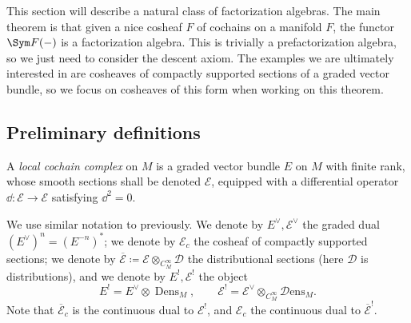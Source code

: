This section will describe a natural class of factorization algebras. The main theorem is that given a nice cosheaf $F$ of cochains on a manifold $F$, the functor $\Sym F(-)$ is a factorization algebra. This is trivially a prefactorization algebra, so we just need to consider the descent axiom. The examples we are ultimately interested in are cosheaves of compactly supported sections of a graded vector bundle, so we focus on cosheaves of this form when working on this theorem.

\subsection{Preliminary definitions}

\begin{definition}\label{dfn:6-5-1}
	A \emph{local cochain complex} on $M$ is a graded vector bundle $E$ on $M$ with finite rank, whose smooth sections shall be denoted $\mathcal{E} $, equipped with a differential operator $\dd : \mathcal{E}  \to \mathcal{E} $ satisfying $\dd ^2=0$.
\end{definition}

We use similar notation to previously. We denote by $E^\vee,\mathcal{E}^\vee $ the graded dual $(E^\vee )^{n} =(E^{-n} )^*$; we denote by $\mathcal{E} _c$ the cosheaf of compactly supported sections; we denote by $\overline{\mathcal{E} } \coloneqq \mathcal{E} \otimes_{C^\infty _M} \mathcal{D}$ the distributional sections (here $\mathcal{D} $ is distributions), and we denote by $E^!,\mathcal{E} ^!$ the object
\[
	E^! = E^\vee \otimes \operatorname{Dens}_M,\qquad \mathcal{E} ^! = \mathcal{E}^\vee  \otimes_{C^\infty _M} \mathcal{D} \mathrm{ens}_M
.\]
Note that $\overline{\mathcal{E} } _c$ is the continuous dual to $\mathcal{E} ^!$, and $\mathcal{E} _c$ the continuous dual to $\overline{\mathcal{E} } ^!$.

